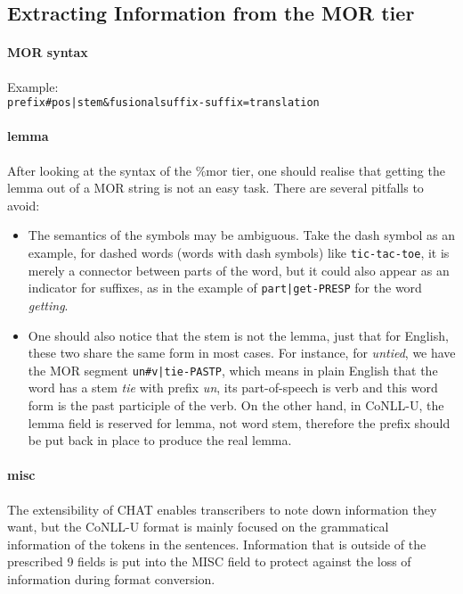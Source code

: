 \subsection{Extracting Information from the MOR tier}



\paragraph{MOR syntax}
Example:\\
\texttt{prefix\#pos|stem\&fusionalsuffix-suffix=translation}



\paragraph{lemma} After looking at the syntax of the \%mor tier, one should realise that getting the lemma out of a MOR string is not an easy task. There are several pitfalls to avoid:\\
\begin{itemize}
	\item The semantics of the symbols may be ambiguous. Take the dash symbol as an example, for dashed words (words with dash symbols) like \texttt{tic-tac-toe}, it is merely a connector between parts of the word, but it could also appear as an indicator for suffixes, as in the example of \texttt{part|get-PRESP} for the word \emph{getting}.
	\item One should also notice that the stem is not the lemma, just that for English, these two share the same form in most cases. For instance, for \emph{untied}, we have the MOR segment \texttt{un\#v|tie-PASTP}, which means in plain English that the word has a stem \emph{tie} with prefix \emph{un}, its part-of-speech is verb and this word form is the past participle of the verb. On the other hand, in CoNLL-U, the lemma field is reserved for lemma, not word stem, therefore the prefix should be put back in place to produce the real lemma.
\end{itemize}

\paragraph{misc}
The extensibility of CHAT enables transcribers to note down information they want, but the CoNLL-U format is mainly focused on the grammatical information of the tokens in the sentences. Information that is outside of the prescribed 9 fields is put into the MISC field to protect against the loss of information during format conversion.

